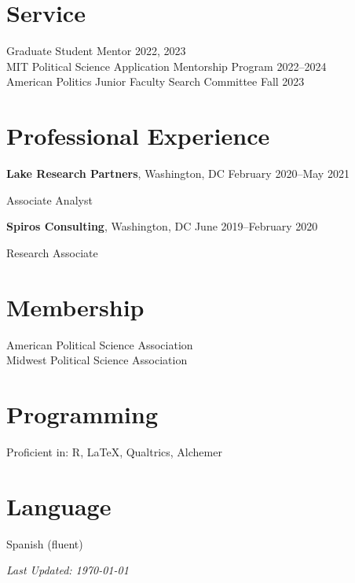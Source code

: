 \documentclass[margin,line]{res}
\newenvironment{list1}{
  \begin{list}{\ding{113}}{%
      \setlength{\itemsep}{0in}
      \setlength{\parsep}{0in} \setlength{\parskip}{0in}
      \setlength{\topsep}{0in} \setlength{\partopsep}{0in}
      \setlength{\leftmargin}{0.17in}}}{\end{list}}
\begin{document}
\begin{resume}
\vspace{0.1in}

\section{\sc Service}
Graduate Student Mentor \hfill {2022, 2023} \\
MIT Political Science Application Mentorship Program \hfill {2022--2024} \\
American Politics Junior Faculty Search Committee \hfill {Fall 2023}

\section{\sc Professional Experience}
{\bf Lake Research Partners}, Washington, DC \hfill {February 2020--May 2021}\\
\vspace*{-.15in}
\begin{list1}
  \item[] Associate Analyst
\end{list1}

{\bf Spiros Consulting}, Washington, DC \hfill {June 2019--February 2020}\\
\vspace*{-.15in}
\begin{list1}
  \item[] Research Associate
\end{list1}

\section{\sc Membership}
American Political Science Association \\
Midwest Political Science Association

\section{\sc Programming}
Proficient in: R, \LaTeX, Qualtrics, Alchemer

\section{\sc Language}
Spanish (fluent)

\begin{center}
\emph{Last Updated: \today}
\end{center}

\end{resume}
\end{document}
